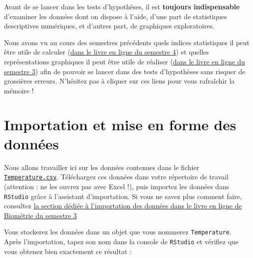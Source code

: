 \documentclass[
  french,
  a4paper,
  DIV=11,
  numbers=noendperiod,
  oneside]{scrreprt}
\begin{document}
\begin{tcolorbox}[enhanced jigsaw, arc=.35mm, bottomrule=.15mm, bottomtitle=1mm, breakable, colback=white, colbacktitle=quarto-callout-important-color!10!white, colframe=quarto-callout-important-color-frame, coltitle=black, left=2mm, leftrule=.75mm, opacityback=0, opacitybacktitle=0.6, rightrule=.15mm, title=\textcolor{quarto-callout-important-color}{\faExclamation}\hspace{0.5em}{À retenir !}, titlerule=0mm, toprule=.15mm, toptitle=1mm]

Avant de se lancer dans les tests d'hypothèses, il est \textbf{toujours
indispensable} d'examiner les données dont on dispose à l'aide, d'une
part de statistiques descriptives numériques, et d'autres part, de
graphiques exploratoires.

Nous avons vu au cours des semestres précédents quels indices
statistiques il peut être utile de calculer
(\href{https://besibo.github.io/BiometrieS4/01-dispersion.html}{dans le
livre en ligne du semestre 4}) et quelles représentations graphiques il
peut être utile de réaliser
(\href{https://besibo.github.io/BiometrieS3/03-visualization.html}{dans
le livre en ligne du semestre 3}) afin de pouvoir se lancer dans des
tests d'hypothèses sans risquer de grossières erreurs. N'hésitez pas à
cliquer sur ces liens pour vous rafraîchir la mémoire !

\end{tcolorbox}

\section{Importation et mise en forme des
données}\label{importation-et-mise-en-forme-des-donnuxe9es}

Nous allons travailler ici sur les données contenues dans le fichier
\href{data/Temperature.csv}{\texttt{Temperature.csv}}. Téléchargez ces
données dans votre répertoire de travail (attention : ne les ouvrez pas
avec Excel !), puis importez les données dans \texttt{RStudio} grâce à
l'assistant d'importation. Si vous ne savez plus comment faire,
consultez
\href{https://besibo.github.io/BiometrieS3/04-DataWrangling.html\#plaintext}{la
section dédiée à l'importation des données dans le livre en ligne de
Biométrie du semestre 3}

Vous stockerez les données dans un objet que vous nommerez
\texttt{Temperature}. Après l'importation, tapez son nom dans la console
de \texttt{RStudio} et vérifiez que vous obtenez bien exactement ce
résultat :
\end{document}
